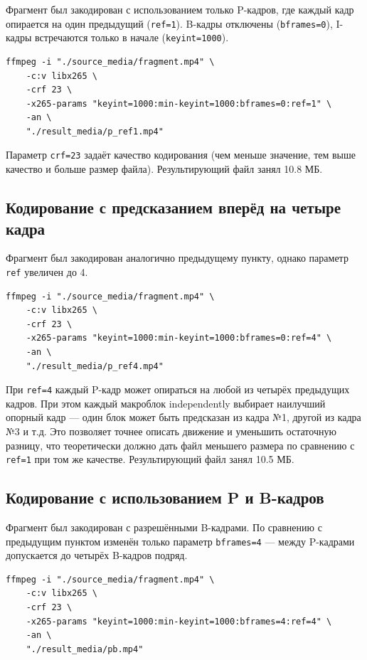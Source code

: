 \documentclass[a4paper,12pt]{article}
\begin{document}
Фрагмент был закодирован с использованием только P-кадров,
где каждый кадр опирается на один предыдущий (\texttt{ref=1}).
B-кадры отключены (\texttt{bframes=0}), I-кадры встречаются
только в начале (\texttt{keyint=1000}).

\begin{verbatim}
ffmpeg -i "./source_media/fragment.mp4" \
    -c:v libx265 \
    -crf 23 \
    -x265-params "keyint=1000:min-keyint=1000:bframes=0:ref=1" \
    -an \
    "./result_media/p_ref1.mp4"
\end{verbatim}

Параметр \texttt{crf=23} задаёт качество кодирования
(чем меньше значение, тем выше качество и больше размер файла).
Результирующий файл занял 10.8 МБ.



\subsection{Кодирование с предсказанием вперёд на четыре кадра}

Фрагмент был закодирован аналогично предыдущему пункту,
однако параметр \texttt{ref} увеличен до 4.

\begin{verbatim}
ffmpeg -i "./source_media/fragment.mp4" \
    -c:v libx265 \
    -crf 23 \
    -x265-params "keyint=1000:min-keyint=1000:bframes=0:ref=4" \
    -an \
    "./result_media/p_ref4.mp4"
\end{verbatim}

При \texttt{ref=4} каждый P-кадр может опираться на любой
из четырёх предыдущих кадров. При этом каждый макроблок
independently выбирает наилучший опорный кадр — один блок
может быть предсказан из кадра №1, другой из кадра №3 и т.д.
Это позволяет точнее описать движение и уменьшить остаточную
разницу, что теоретически должно дать файл меньшего размера
по сравнению с \texttt{ref=1} при том же качестве.
Результирующий файл занял 10.5 МБ.


\subsection{Кодирование с использованием P и B-кадров}

Фрагмент был закодирован с разрешёнными B-кадрами.
По сравнению с предыдущим пунктом изменён только параметр
\texttt{bframes=4} — между P-кадрами допускается до четырёх
B-кадров подряд.

\begin{verbatim}
ffmpeg -i "./source_media/fragment.mp4" \
    -c:v libx265 \
    -crf 23 \
    -x265-params "keyint=1000:min-keyint=1000:bframes=4:ref=4" \
    -an \
    "./result_media/pb.mp4"
\end{verbatim}
\end{document}
